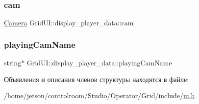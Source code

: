 \subsubsection{\texorpdfstring{cam}{cam}}
{\footnotesize\ttfamily \hyperlink{struct_camera}{Camera} Grid\+U\+I\+::display\+\_\+player\+\_\+data\+::cam}

\mbox{\label{struct_grid_u_i_1_1display__player__data_a32f33b258d66863e0ee32137c5d0ec1a}} 
\subsubsection{\texorpdfstring{playing\+Cam\+Name}{playingCamName}}
{\footnotesize\ttfamily string$\ast$ Grid\+U\+I\+::display\+\_\+player\+\_\+data\+::playing\+Cam\+Name}



Объявления и описания членов структуры находятся в файле\+:\begin{DoxyCompactItemize}
\item 
/home/jetson/controlroom/\+Studio/\+Operator/\+Grid/include/\hyperlink{_operator_2_grid_2include_2ui_8h}{ui.\+h}\end{DoxyCompactItemize}
